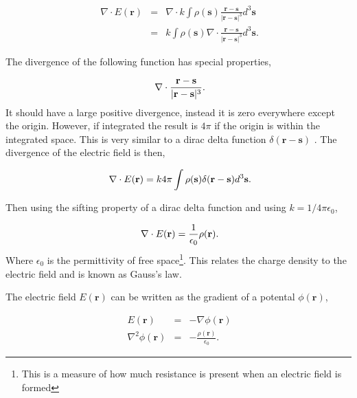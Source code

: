 \begin{eqnarray}
\ \nabla \cdot E(\mathbf{r}) &=& \nabla \cdot k \int  \rho(\mathbf{s}) \frac{\mathbf{r} - \mathbf{s}}{\vert \mathbf{r} - \mathbf{s} \vert^3} d^3 \mathbf{s} \\
\ &=& k \int \rho(\mathbf{s}) \nabla \cdot \frac{\mathbf{r} - \mathbf{s}}{\vert \mathbf{r} - \mathbf{s} \vert^3} d^3 \mathbf{s} .
\end{eqnarray}

The divergence of the following function has special properties,

\begin{equation}
\ \nabla \cdot \frac{\mathbf{r} - \mathbf{s}}{\vert \mathbf{r} - \mathbf{s} \vert^3} \\.
\end{equation}
%
It should have a large positive divergence, instead it is zero everywhere except the origin.  However, if integrated the result is $4\pi$ if the origin is within the integrated space.  This is very similar to a dirac delta function $\delta ( \mathbf{r} - \mathbf{s})$ \cite{intro_electrodynamics_book}.  The divergence of the electric field is then,

\begin{equation}
\ \nabla \cdot E(\mathbf{r} )=k 4 \pi \int \rho(\mathbf{s}) \delta ( \mathbf{r} - \mathbf{s}) d^3 \mathbf{s} \\.
\end{equation}

Then using the sifting property of a dirac delta function and using $k=1/4\pi \epsilon_0$,

\begin{equation}
\ \nabla \cdot E(\mathbf{r} )=\frac{1}{\epsilon_0} \rho(\mathbf{r}) \\.
\end{equation}
%
Where $\epsilon_0$ is the permittivity of free space\footnote{This is a measure of how much resistance is present when an electric field is formed}.  This relates the charge density to the electric field and is known as Gauss's law.

The electric field $E(\mathbf{r})$ can be written as the gradient of a potental $\phi(\mathbf{r})$,

\begin{eqnarray}
\ E(\mathbf{r}) &=& - \nabla \phi(\mathbf{r}) \\ \label{eq:poisson_equation}
\ \nabla^2 \phi(\mathbf{r}) &=& - \frac{\rho(\mathbf{r})}{\epsilon_0} .
\end{eqnarray}

